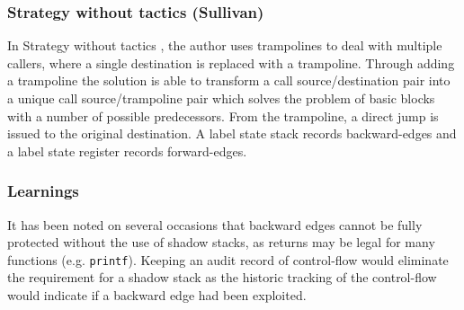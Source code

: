 \subsubsection{Strategy without tactics (Sullivan)}
In Strategy without tactics \cite{Davi2015}, the author uses trampolines to deal with multiple callers, where a single destination is replaced with a trampoline. Through adding a trampoline the solution is able to transform a call source\slash destination pair into a unique call source\slash trampoline pair which solves the problem of basic blocks with a number of possible predecessors. From the trampoline, a direct jump is issued to the original destination. A label state stack records backward-edges and a label state register records forward-edges. 

\subsubsection{Learnings}
It has been noted on several occasions that backward edges cannot be fully protected without the use of shadow stacks, as returns may be legal for many functions (e.g. \verb|printf|). Keeping an audit record of control-flow would eliminate the requirement for a shadow stack as the historic tracking of the control-flow would indicate if a backward edge had been exploited.